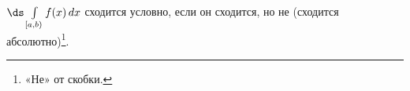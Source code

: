 
    	$\ds\int\limits_{[a,b)}f(x)\,dx$ сходится условно, если он сходится, но не \textup{(}сходится абсолютно\textup{)}\footnote{«Не» от скобки.}.
    